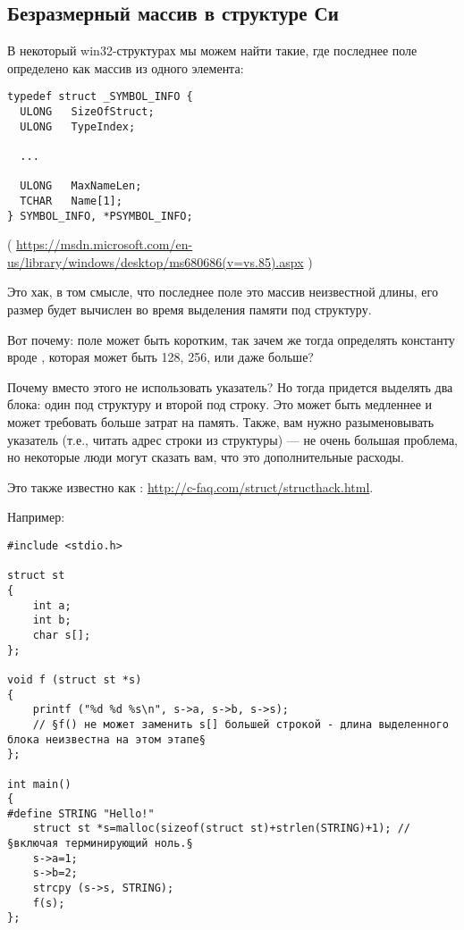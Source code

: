 \subsection{Безразмерный массив в структуре Си}

В некоторый win32-структурах мы можем найти такие, где последнее поле определено как массив из одного элемента:

\begin{lstlisting}[style=customc]
typedef struct _SYMBOL_INFO {
  ULONG   SizeOfStruct;
  ULONG   TypeIndex;
  
  ...

  ULONG   MaxNameLen;
  TCHAR   Name[1];
} SYMBOL_INFO, *PSYMBOL_INFO;
\end{lstlisting}

( \url{https://msdn.microsoft.com/en-us/library/windows/desktop/ms680686(v=vs.85).aspx} )

Это хак, в том смысле, что последнее поле это массив неизвестной длины, его размер будет вычислен во время выделения
памяти под структуру.

Вот почему: поле  может быть коротким, так зачем же тогда определять константу вроде ,
которая может быть 128, 256, или даже больше?

Почему вместо этого не использовать указатель? Но тогда придется выделять два блока: один под структуру и второй
под строку.
Это может быть медленнее и может требовать больше затрат на память.
Также, вам нужно разыменовывать указатель (т.е., читать адрес строки из структуры) --- не очень большая проблема,
но некоторые люди могут сказать вам, что это дополнительные расходы.

Это также известно как : \url{http://c-faq.com/struct/structhack.html}.

Например:

\begin{lstlisting}[style=customc]
#include <stdio.h>

struct st
{
	int a;
	int b;
	char s[];
};

void f (struct st *s)
{
	printf ("%d %d %s\n", s->a, s->b, s->s);
	// §f() не может заменить s[] большей строкой - длина выделенного блока неизвестна на этом этапе§
};

int main()
{
#define STRING "Hello!"
	struct st *s=malloc(sizeof(struct st)+strlen(STRING)+1); // §включая терминирующий ноль.§
	s->a=1;
	s->b=2;
	strcpy (s->s, STRING);
	f(s);
};
\end{lstlisting}

